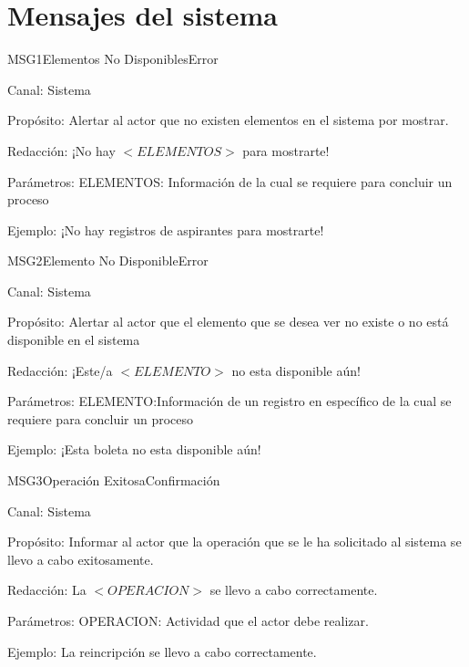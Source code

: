 \chapter{Mensajes del sistema}
\label{chapter:mensajes}


\begin{mensaje}{MSG1}{Elementos No Disponibles}{Error \msgError}
	\item[Canal:] Sistema
    \item[Propósito:] Alertar al actor que no existen elementos en el sistema por mostrar.
    \item[Redacción:] ¡No hay $<ELEMENTOS>$ para mostrarte!
    \item[Parámetros:] ELEMENTOS: Información de la cual se requiere para concluir un proceso
    \item[Ejemplo:] ¡No hay registros de aspirantes para mostrarte!
\end{mensaje}

\begin{mensaje}{MSG2}{Elemento No Disponible}{Error \msgError}
	\item[Canal:] Sistema
    \item[Propósito:] Alertar al actor que el elemento que se desea ver no existe o no está disponible en el sistema
    \item[Redacción:] ¡Este/a $<ELEMENTO>$ no esta disponible aún!
    \item[Parámetros:] ELEMENTO:Información de un registro en específico de la cual se requiere para concluir un proceso
    \item[Ejemplo:] ¡Esta boleta no esta disponible aún!
\end{mensaje}

\begin{mensaje}{MSG3}{Operación Exitosa}{Confirmación \msgConfirm}
	\item[Canal:] Sistema
    \item[Propósito:] Informar al actor que la operación que se le ha solicitado al sistema se llevo a cabo exitosamente.
    \item[Redacción:] La $<OPERACION>$ se llevo a cabo correctamente.
    \item[Parámetros:] OPERACION: Actividad que el actor debe realizar.
    \item[Ejemplo:] La reincripción se llevo a cabo correctamente.
\end{mensaje}

